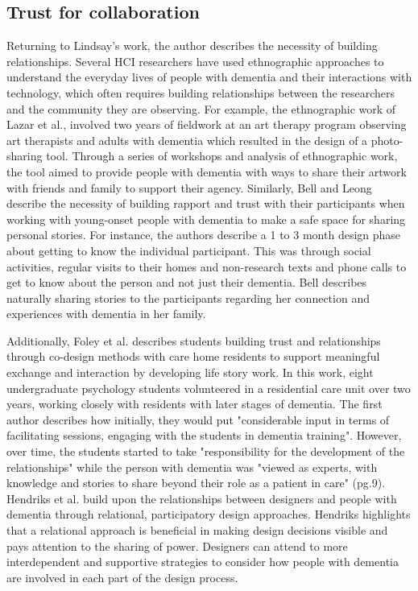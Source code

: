 \subsection{Trust for collaboration}
\label{BL:Trust}
Returning to Lindsay's work, the author describes the necessity of building relationships. Several HCI researchers have used ethnographic approaches to understand the everyday lives of people with dementia and their interactions with technology, which often requires building relationships between the researchers and the community they are observing. For example, the ethnographic work of Lazar et al., involved two years of fieldwork at an art therapy program observing art therapists and adults with dementia which resulted in the design of a photo-sharing tool. Through a series of workshops and analysis of ethnographic work, the tool aimed to provide people with dementia with ways to share their artwork with friends and family to support their agency. Similarly, Bell and Leong describe the necessity of building rapport and trust with their participants when working with young-onset people with dementia to make a safe space for sharing personal stories. For instance, the authors describe a 1 to 3 month design phase about getting to know the individual participant. This was through social activities, regular visits to their homes and non-research texts and phone calls to get to know about the person and not just their dementia. Bell describes naturally sharing stories to the participants regarding her connection and experiences with dementia in her family. 

Additionally, Foley et al. describes students building trust and relationships through co-design methods with care home residents to support meaningful exchange and interaction by developing life story work. In this work, eight undergraduate psychology students volunteered in a residential care unit over two years, working closely with residents with later stages of dementia. The first author describes how initially, they would put "considerable input in terms of facilitating sessions, engaging with the students in dementia training". However, over time, the students started to take "responsibility for the development of the relationships" while the person with dementia was "viewed as experts, with knowledge and stories to share beyond their role as a patient in care" (pg.9). Hendriks et al. build upon the relationships between designers and people with dementia through relational, participatory design approaches. Hendriks highlights that a relational approach is beneficial in making design decisions visible and pays attention to the sharing of power. Designers can attend to more interdependent and supportive strategies to consider how people with dementia are involved in each part of the design process. 


